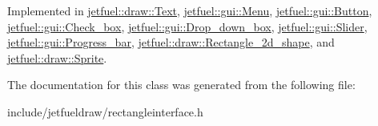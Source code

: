 Implemented in \hyperlink{classjetfuel_1_1draw_1_1Text_a362996e996d471729944eebdff1f7636}{jetfuel\+::draw\+::\+Text}, \hyperlink{classjetfuel_1_1gui_1_1Menu_a1d5c050dcad48008898eafe2d610eff6}{jetfuel\+::gui\+::\+Menu}, \hyperlink{classjetfuel_1_1gui_1_1Button_a99615af8c169d2274b1593a29fdaf7ca}{jetfuel\+::gui\+::\+Button}, \hyperlink{classjetfuel_1_1gui_1_1Check__box_a09feae5781a788df462be6276e2d1c54}{jetfuel\+::gui\+::\+Check\+\_\+box}, \hyperlink{classjetfuel_1_1gui_1_1Drop__down__box_ab07ac526f3c2e9930398d78c7cad2d52}{jetfuel\+::gui\+::\+Drop\+\_\+down\+\_\+box}, \hyperlink{classjetfuel_1_1gui_1_1Slider_abab31dbe01b716b4e82919f0d8aba96c}{jetfuel\+::gui\+::\+Slider}, \hyperlink{classjetfuel_1_1gui_1_1Progress__bar_a4a09c3d515c9754b8295a4b5d83291ff}{jetfuel\+::gui\+::\+Progress\+\_\+bar}, \hyperlink{classjetfuel_1_1draw_1_1Rectangle__2d__shape_a1ed2975565e629d2b8d3fffa0a4756b2}{jetfuel\+::draw\+::\+Rectangle\+\_\+2d\+\_\+shape}, and \hyperlink{classjetfuel_1_1draw_1_1Sprite_a2cd3f83c4fc573be82d3dc3a9c70e317}{jetfuel\+::draw\+::\+Sprite}.



The documentation for this class was generated from the following file\+:\begin{DoxyCompactItemize}
\item 
include/jetfueldraw/rectangleinterface.\+h\end{DoxyCompactItemize}
